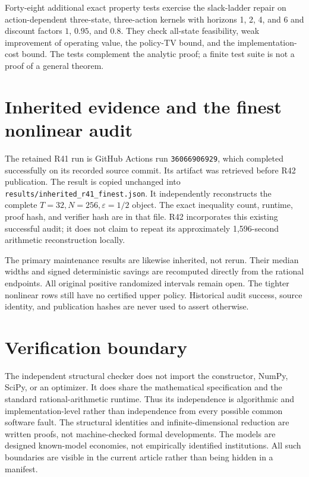 Forty-eight additional exact property tests exercise the slack-ladder repair on action-dependent three-state, three-action kernels with horizons 1, 2, 4, and 6 and discount factors $1$, $0.95$, and $0.8$. They check all-state feasibility, weak improvement of operating value, the policy-TV bound, and the implementation-cost bound. The tests complement the analytic proof; a finite test suite is not a proof of a general theorem.

\section{Inherited evidence and the finest nonlinear audit}
The retained R41 run is GitHub Actions run \texttt{36066906929}, which completed successfully on its recorded source commit. Its artifact was retrieved before R42 publication. The result is copied unchanged into \texttt{results/inherited\_r41\_finest.json}. It independently reconstructs the complete $T=32,N=256,\varepsilon=1/2$ object. The exact inequality count, runtime, proof hash, and verifier hash are in that file. R42 incorporates this existing successful audit; it does not claim to repeat its approximately 1,596-second arithmetic reconstruction locally.

The primary maintenance results are likewise inherited, not rerun. Their median widths and signed deterministic savings are recomputed directly from the rational endpoints. All original positive randomized intervals remain open. The tighter nonlinear rows still have no certified upper policy. Historical audit success, source identity, and publication hashes are never used to assert otherwise.

\section{Verification boundary}
The independent structural checker does not import the constructor, NumPy, SciPy, or an optimizer. It does share the mathematical specification and the standard rational-arithmetic runtime. Thus its independence is algorithmic and implementation-level rather than independence from every possible common software fault. The structural identities and infinite-dimensional reduction are written proofs, not machine-checked formal developments. The models are designed known-model economies, not empirically identified institutions. All such boundaries are visible in the current article rather than being hidden in a manifest.

